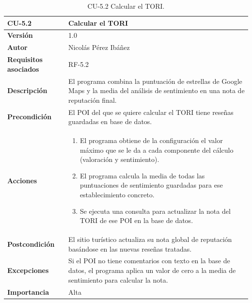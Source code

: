 \begin{table}[p]
	\centering
	\begin{tabularx}{\linewidth}{ p{} p{} }
		\toprule
		\textbf{CU-5.2}  & \textbf{Calcular el TORI}\\
		\toprule
		\textbf{Versión}              & 1.0    \\
		\textbf{Autor}                & Nicolás Pérez Ibáñez \\
		\textbf{Requisitos asociados} & RF-5.2 \\
		\textbf{Descripción}          & El programa combina la puntuación de estrellas de Google Maps y la media del análisis de sentimiento en una nota de reputación final. \\
		\textbf{Precondición}         & El POI del que se quiere calcular el TORI tiene reseñas guardadas en base de datos. \\
		\textbf{Acciones}             &
		\begin{enumerate}
			\def\labelenumi{\arabic{enumi}.}
			\tightlist
			\item El programa obtiene de la configuración el valor máximo que se le da a cada componente del cálculo (valoración y sentimiento).
			\item El programa calcula la media de todas las puntuaciones de sentimiento guardadas para ese establecimiento concreto.
			\item Se ejecuta una consulta para actualizar la nota del TORI de ese POI en la base de datos.
		\end{enumerate}\\
		\textbf{Postcondición}        & El sitio turístico actualiza su nota global de reputación basándose en las nuevas reseñas tratadas. \\
		\textbf{Excepciones}          & Si el POI no tiene comentarios con texto en la base de datos, el programa aplica un valor de cero a la media de sentimiento para calcular la nota. \\
		\textbf{Importancia}          & Alta \\
		\bottomrule
	\end{tabularx}
	\caption{CU-5.2 Calcular el TORI.}
\end{table}

